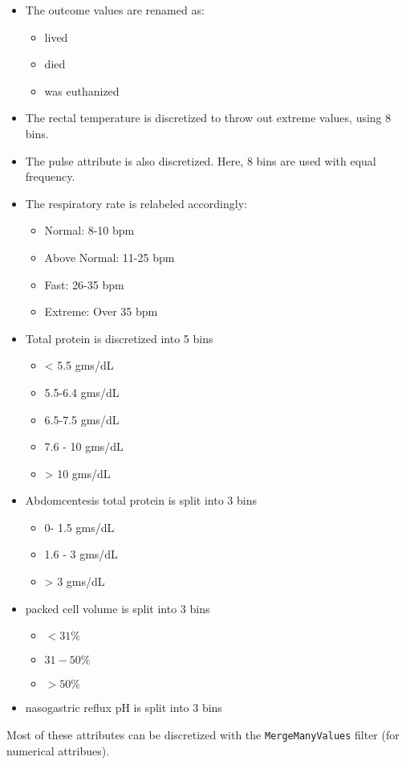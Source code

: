 \begin{itemize}
\item The outcome values are renamed as:
\begin{itemize}
\item lived
\item died
\item was euthanized
\end{itemize}

\item The rectal temperature is discretized to throw out extreme values, using 8 bins.

\item The pulse attribute is also discretized. Here, 8 bins are used with equal frequency.

\item The respiratory rate is relabeled accordingly:
\begin{itemize}
\item Normal: 8-10 bpm
\item Above Normal: 11-25 bpm
\item Fast: 26-35 bpm
\item Extreme: Over 35 bpm
\end{itemize}

\item Total protein is discretized into 5 bins
\begin{itemize}
\item < 5.5 gms/dL
\item 5.5-6.4 gms/dL
\item 6.5-7.5 gms/dL
\item 7.6 - 10 gms/dL
\item > 10 gms/dL
\end{itemize}


\item Abdomcentesis total protein is split into 3 bins
\begin{itemize}
\item 0- 1.5 gms/dL
\item 1.6 - 3 gms/dL
\item > 3 gms/dL
\end{itemize}

\item packed cell volume is split into 3 bins
\begin{itemize}
\item $< 31 \%$
\item $31-50 \%$
\item $> 50 \%$
\end{itemize}

\item nasogastric reflux pH is split into 3 bins


\end{itemize}

Most of these attributes can be discretized with the \verb|MergeManyValues| filter (for numerical attribues).
